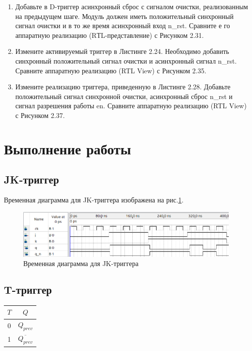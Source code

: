 \documentclass[a4paper,14pt]{article}
\begin{document}
\begin{enumerate}
	\item Добавьте в D-триггер асинхронный сброс с сигналом очистки, реализованным на предыдущем шаге.
	Модуль должен иметь положительный синхронный сигнал очистки и в то же время асинхронный вход n\_rst.
	Сравните е го аппаратную реализацию (RТL-представление) с Рисунком 2.31.
	
	\item Измените активируемый триггер в Листинге 2.24.
	Необходимо добавить синхронный положительный сигнал очистки и асинхронный сигнал n\_rst.
	Сравните аппаратную реализацию (RTL View) с Рисунком 2.35.
	
	\item Измените реализацию триггера, приведенную в Листинге 2.28. 
	Добавьте положительный сигнал синхронной очистки, асинхронный сброс n\_rst и сигнал разрешения работы en.
	Сравните аппаратную реализацию (RTL View) с Рисунком 2.37.
\end{enumerate}

\section{Выполнение работы}

\subsection{JK-триггер}


Временная диаграмма для JK-триггера изображена на рис.\ref{fig:jk_wave}.

\begin{figure}[H]
	\centering
	\includegraphics[width=0.95\linewidth]{imgs/jk_wave}
	\caption{Временная диаграмма для JK-триггера}
	\label{fig:jk_wave}
\end{figure}


\subsection{T-триггер}


\begin{table}[]
	\begin{center}
		\begin{flushleft}
		\end{flushleft}
		\label{tab:t_flip_flop}
		\begin{tabular}{|c|c|}
			\hline
			$T$ & $Q$                   \\ \hline
			0   & $Q_{prev}$            \\ \hline
			1   & $\overline{Q_{prev}}$ \\ \hline
		\end{tabular}
	\end{center}
\end{table}
\end{document}
